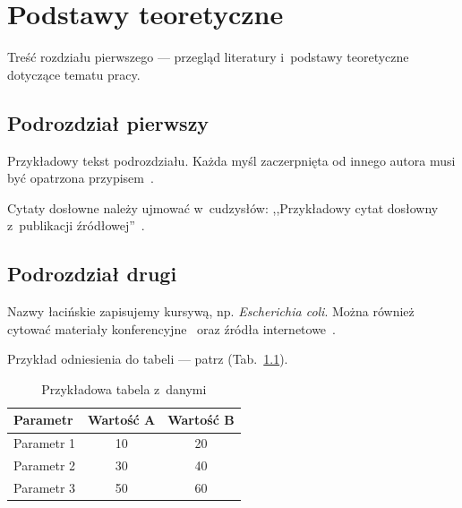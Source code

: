 \chapter{Podstawy teoretyczne}

Treść rozdziału pierwszego --- przegląd literatury i~podstawy teoretyczne dotyczące
tematu pracy.

\section{Podrozdział pierwszy}

Przykładowy tekst podrozdziału. Każda myśl zaczerpnięta od innego autora musi być
opatrzona przypisem~\cite{przyklad-ksiazka}.

Cytaty dosłowne należy ujmować w~cudzysłów: ,,Przykładowy cytat dosłowny z~publikacji
źródłowej''~\cite{przyklad-artykul}.

\section{Podrozdział drugi}

Nazwy łacińskie zapisujemy kursywą, np. \textit{Escherichia coli}.
Można również cytować materiały konferencyjne~\cite{przyklad-konferencja}
oraz źródła internetowe~\cite{przyklad-internet}.

Przykład odniesienia do tabeli --- patrz (Tab.~\ref{tab:przyklad}).

\begin{table}[htbp]
  \caption{Przykładowa tabela z~danymi}\label{tab:przyklad}
  \centering
  \begin{tabular}{lcc}
    \toprule
    \textbf{Parametr} & \textbf{Wartość A} & \textbf{Wartość B} \\
    \midrule
    Parametr 1 & 10 & 20 \\
    Parametr 2 & 30 & 40 \\
    Parametr 3 & 50 & 60 \\
    \bottomrule
  \end{tabular}
\end{table}
